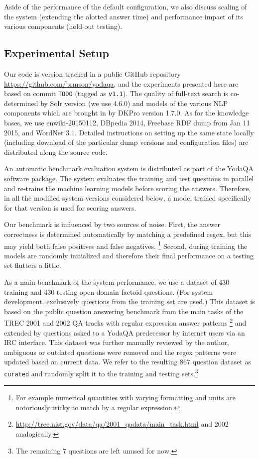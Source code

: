 Aside of the performance of the default configuration, we also discuss
scaling of the system (extending the alotted answer time) and performance
impact of its various components (hold-out testing).

\subsection{Experimental Setup}
\label{sec:expsetup}

Our code is version tracked in a public GitHub repository
\url{https://github.com/brmson/yodaqa}, and the experiments presented
here are based on commit \texttt{TODO} (tagged as \texttt{v1.1}).
The quality of full-text search is co-determined by Solr version
(we use 4.6.0) and models of the various NLP components which are brought
in by DKPro version 1.7.0.
As for the knowledge bases, we use enwiki-20150112, DBpedia 2014,
Freebase RDF dump from Jan 11 2015, and WordNet 3.1.
Detailed instructions on setting up the same state locally (including
download of the particular dump versions and configuration files) are
distributed along the source code.

An automatic benchmark evaluation system is distributed as part of the
YodaQA software package.  The system evaluates the training and test questions
in parallel and re-trains the machine learning models before scoring the answers.
Therefore, in all the modified system versions considered below, a model trained
specifically for that version is used for scoring answers.

Our benchmark is influenced by two sources of noise.
First, the answer correctness is determined automatically by matching a predefined regex,
but this may yield both false positives and false negatives.%
\footnote{For example numerical quantities with varying formatting and units are notoriously tricky to match by a regular expression.}
Second, during training the models are randomly initialized and therefore their final
performance on a testing set flutters a little.

As a main benchmark of the system performance, we use a dataset of 430 training
and 430 testing open domain factoid questions.
(For system development, exclusively questions from the training set are used.)
This dataset is based on the public question answering benchmark from
the main tasks of the TREC 2001 and 2002 QA tracks
with regular expression answer patterns%
\footnote{\url{http://trec.nist.gov/data/qa/2001_qadata/main_task.html} and 2002 analogically.}
and extended by questions asked
to a YodaQA predecessor by internet users via an IRC interface.
This dataset was further manually reviewed by the author,
ambiguous or outdated questions were removed
and the regex patterns were updated based on current data.
We refer to the resulting 867 question dataset as \texttt{curated} and
randomly split it to the training and testing sets.\footnote{The remaining
7 questions are left unused for now.}

